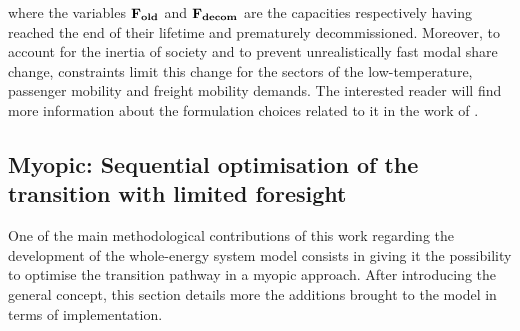 \noindent
where the variables $\textbf{F\textsubscript{old}}$ and $\textbf{F\textsubscript{decom}}$ are the capacities respectively having reached the end of their lifetime and prematurely decommissioned. Moreover, to account for the inertia of society and to prevent unrealistically fast modal share change, constraints limit this change for the sectors of the low-temperature, passenger mobility and freight mobility demands. The interested reader will find more information about the formulation choices related to it in the work of \citet{limpens2024pathway}. 

\subsection[Myopic: Sequential optimisation of the transition]{Myopic: Sequential optimisation of the transition with limited foresight}
\label{subsec:meth:MY}

One of the main methodological contributions of this work regarding the development of the whole-energy system model consists in giving it the possibility to optimise the transition pathway in a myopic approach. After introducing the general concept, this section details more the additions brought to the model in terms of implementation.\\

\\

